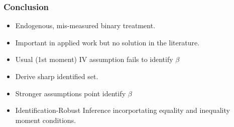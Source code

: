 \documentclass{beamer}
\begin{document}
%
%  
%  
%
%  
%  
%

\begin{frame}
  \frametitle{Conclusion}

  \begin{itemize}
    \item Endogenous, mis-measured binary treatment.
    \item Important in applied work but no solution in the literature.
      \item Usual (1st moment) IV assumption fails to identify $\beta$
    \item Derive sharp identified set.
      \item Stronger assumptions point identify $\beta$
      \item Identification-Robust Inference incorportating equality and inequality moment conditions.
   \end{itemize}

\end{frame}
\appendix
\end{document}
